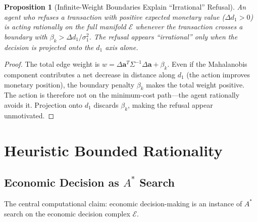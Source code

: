 \documentclass[12pt]{article}
\newtheorem{proposition}[theorem]{Proposition}
\theoremstyle{definition}
\theoremstyle{remark}
\newcommand{\E}{\mathcal{E}}               %
\begin{document}
\begin{proposition}[Infinite-Weight Boundaries Explain ``Irrational'' Refusal]
\label{prop:infinite_weight}
An agent who refuses a transaction with positive expected monetary value ($\Delta d_1 > 0$) is acting rationally on the full manifold $\E$ whenever the transaction crosses a boundary with $\beta_k > \Delta d_1 / \sigma_1^2$.  The refusal appears ``irrational'' only when the decision is projected onto the $d_1$ axis alone.
\end{proposition}

\begin{proof}
The total edge weight is $w = \Delta \mathbf{a}^T \Sigma^{-1} \Delta \mathbf{a} + \beta_k$.  Even if the Mahalanobis component contributes a net decrease in distance along $d_1$ (the action improves monetary position), the boundary penalty $\beta_k$ makes the total weight positive.  The action is therefore not on the minimum-cost path---the agent rationally avoids it.  Projection onto $d_1$ discards $\beta_k$, making the refusal appear unmotivated.
\end{proof}


\section{Heuristic Bounded Rationality}
\label{sec:heuristic}

\subsection{Economic Decision as $A^*$ Search}

The central computational claim: economic decision-making is an instance of $A^*$ search on the economic decision complex $\E$.
\end{document}
